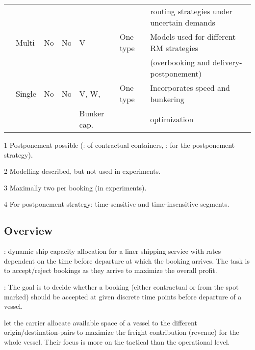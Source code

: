 {\begin{landscape}
\begin{table}[width=0.95\linewidth,cols=7,pos=p]
\begin{footnotesize}
\begin{threeparttable}
\begin{tabular*}{\tblwidth}{@{} *{7}{L} @{}}
					&						&			&			&				&										& routing strategies under uncertain demands \\
\citet{Wang19b}		& Multi 				& No	& No		& V				& One type						& Models used for different RM strategies \\
					&						&			&			& 				&										& (overbooking and delivery-postponement)\\
\citet{Wang19a}		& Single 				& No 		& No		& V, W,			& One type								& Incorporates speed and bunkering \\
					&						&			&			& Bunker cap.	& 										& optimization \\
\bottomrule
\end{tabular*}
\begin{tablenotes}\scriptsize
\item[1] Postponement possible (\citet{Lee07}: of contractual containers, \citet{Wang19b}: for the postponement strategy).
\item[2] Modelling described, but not used in experiments. %
\item[3] Maximally two per booking (in experiments).
\item[4] For postponement strategy: time-sensitive and time-insensitive segments.
\end{tablenotes}
\end{threeparttable}
\end{footnotesize}
\end{table}
\end{landscape}
}

\subsection{Overview}
\citet{Maragos94}: dynamic ship capacity allocation for a liner shipping service with rates dependent on the time before departure at which the booking arrives. The task is to accept/reject bookings as they arrive to maximize the overall profit. 

\citet{Lee07}: The goal is to decide whether a booking (either contractual or from the spot marked) should be accepted at given discrete time points before departure of a vessel.   

\citet{Ting04} let the carrier allocate available space of a vessel to the different origin/destination-pairs to maximize the freight contribution (revenue) for the whole vessel. Their focus is more on the tactical than the operational level. 

